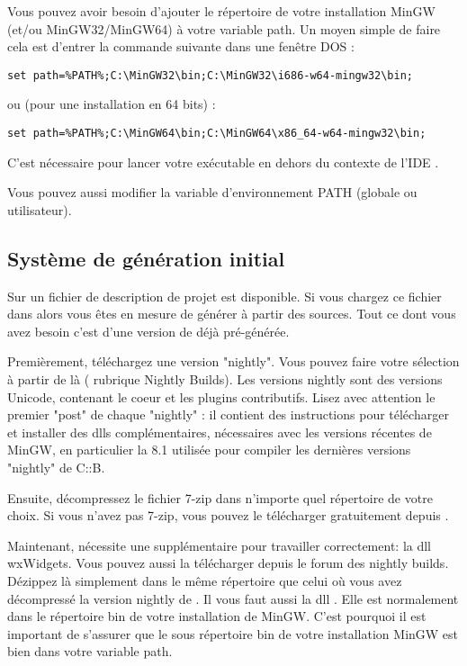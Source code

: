 Vous pouvez avoir besoin d'ajouter le répertoire  de votre installation MinGW (et/ou MinGW32/MinGW64) à votre variable path. Un moyen simple de faire cela est d'entrer la commande suivante dans une fenêtre DOS :

\begin{verbatim}
set path=%PATH%;C:\MinGW32\bin;C:\MinGW32\i686-w64-mingw32\bin;
\end{verbatim}
ou (pour une installation en 64 bits) :
\begin{verbatim}
set path=%PATH%;C:\MinGW64\bin;C:\MinGW64\x86_64-w64-mingw32\bin;
\end{verbatim}

C'est nécessaire pour lancer votre exécutable en dehors du contexte de l'IDE \codeblocks.

Vous pouvez aussi modifier la variable d'environnement PATH (globale ou utilisateur).


\subsection{Système de génération initial}

Sur \cite{url:cb} un fichier de description de projet  est disponible. Si vous chargez ce fichier dans \codeblocks alors vous êtes en mesure de générer \codeblocks à partir des sources. Tout ce dont vous avez besoin c'est d'une version de \codeblocks déjà pré-générée.

Premièrement, téléchargez une version "nightly". Vous pouvez faire votre sélection à partir de là (\cite{url:cbforum} rubrique Nightly Builds). Les versions nightly sont des versions Unicode, contenant le coeur et les plugins contributifs. Lisez avec attention le premier "post" de chaque "nightly" : il contient des instructions pour télécharger et installer des dlls complémentaires, nécessaires avec les versions récentes de MinGW, en particulier la 8.1 utilisée pour compiler les dernières versions "nightly" de C::B.

Ensuite, décompressez le fichier 7-zip dans n'importe quel répertoire de votre choix. Si vous n'avez pas 7-zip, vous pouvez le télécharger gratuitement depuis \cite{url:zip}.

Maintenant, \codeblocks nécessite une  supplémentaire pour travailler correctement: la dll wxWidgets. Vous pouvez aussi la télécharger depuis le forum des nightly builds. Dézippez là simplement dans le même répertoire que celui où vous avez décompressé la version nightly de \codeblocks . Il vous faut aussi la dll . Elle est normalement dans le répertoire bin de votre installation de MinGW. C'est pourquoi il est important de s'assurer que le sous répertoire bin de votre installation MinGW est bien dans votre variable path.

